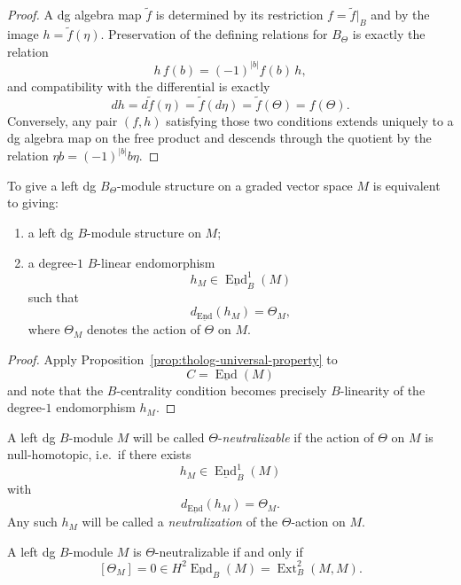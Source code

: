 \begin{proof}
A dg algebra map \(\widetilde f\) is determined by its restriction \(f=\widetilde f|_{B}\) and by the image
\(h=\widetilde f(\eta)\).
Preservation of the defining relations for \(B_{\Theta}\) is exactly the relation
\[
h\,f(b)=(-1)^{|b|}f(b)\,h,
\]
and compatibility with the differential is exactly
\[
dh=d\widetilde f(\eta)=\widetilde f(d\eta)=\widetilde f(\Theta)=f(\Theta).
\]
Conversely, any pair \((f,h)\) satisfying those two conditions extends uniquely to a dg algebra map on the free product and descends through the quotient by the relation \(\eta b=(-1)^{|b|}b\eta\).
\end{proof}

\begin{corollary}
To give a left dg \(B_{\Theta}\)-module structure on a graded vector space \(M\) is equivalent to giving:
\begin{enumerate}
\item a left dg \(B\)-module structure on \(M\);
\item a degree-\(1\) \(B\)-linear endomorphism
\[
h_{M}\in \underline{\operatorname{End}}^{1}_{B}(M)
\]
such that
\[
d_{\underline{\operatorname{End}}}(h_{M})=\Theta_{M},
\]
where \(\Theta_{M}\) denotes the action of \(\Theta\) on \(M\).
\end{enumerate}
\end{corollary}

\begin{proof}
Apply Proposition~\ref{prop:tholog-universal-property} to
\[
C=\underline{\operatorname{End}}(M)
\]
and note that the \(B\)-centrality condition becomes precisely \(B\)-linearity of the degree-\(1\) endomorphism \(h_{M}\).
\end{proof}

\begin{definition}
A left dg \(B\)-module \(M\) will be called \(\Theta\)-\emph{neutralizable} if the action of \(\Theta\) on \(M\) is null-homotopic, i.e.\ if there exists
\[
h_{M}\in \underline{\operatorname{End}}^{1}_{B}(M)
\]
with
\[
d_{\underline{\operatorname{End}}}(h_{M})=\Theta_{M}.
\]
Any such \(h_{M}\) will be called a \emph{neutralization} of the \(\Theta\)-action on \(M\).
\end{definition}

\begin{corollary}
A left dg \(B\)-module \(M\) is \(\Theta\)-neutralizable if and only if
\[
[\Theta_{M}]=0\in H^{2}\underline{\operatorname{End}}_{B}(M)
=\operatorname{Ext}^{2}_{B}(M,M).
\]
\end{corollary}

